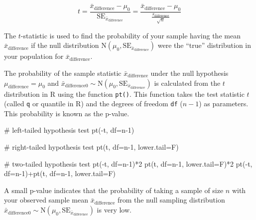 \documentclass[
  letterpaper,
  DIV=11,
  numbers=noendperiod]{scrartcl}
\newenvironment{Shaded}{\begin{snugshade}}{\end{snugshade}}
\newcommand{\AttributeTok}[1]{\textcolor[rgb]{0.40,0.45,0.13}{#1}}
\newcommand{\CommentTok}[1]{\textcolor[rgb]{0.37,0.37,0.37}{#1}}
\newcommand{\DecValTok}[1]{\textcolor[rgb]{0.68,0.00,0.00}{#1}}
\newcommand{\FunctionTok}[1]{\textcolor[rgb]{0.28,0.35,0.67}{#1}}
\newcommand{\NormalTok}[1]{\textcolor[rgb]{0.00,0.23,0.31}{#1}}
\newcommand{\SpecialCharTok}[1]{\textcolor[rgb]{0.37,0.37,0.37}{#1}}
\begin{document}
\[
t=\frac{\bar{x}_{\text{difference}}-\mu_0}{\text{SE}_{\bar{x}_{\text{difference}}}}=\frac{\bar{x}_{\text{difference}}-\mu_0}{\frac{s_{\text{difference}}}{\sqrt{n}}}
\]

The \(t\)-statistic is used to find the probability of your sample
having the mean \(\bar{x}_{\text{difference}}\) if the null distribution
\(\text{N}\left(\mu_0, \text{SE}_{\bar{x}_{\text{difference}}}\right)\)
were the ``true'' distribution in your population for
\(\bar{x}_{\text{difference}}\).

The probability of the sample statistic \(\bar{x}_{\text{difference}}\)
under the null hypothesis \(\mu_{\text{difference}}=\mu_0\) and
\(\bar{x}_{\text{difference0}} \sim \text{N}\left(\mu_0, \text{SE}_{\bar{x}_{\text{difference}}}\right)\)
is calculated from the \(t\) distribution in R using the function
\texttt{pt()}. This function takes the test statistic \(t\) (called
\texttt{q} or quantile in R) and the degrees of freedom \texttt{df}
(\(n-1\)) as parameters. This probability is known as the p-value.

\begin{Shaded}
\begin{Highlighting}[]
\CommentTok{\# left{-}tailed hypothesis test}
\FunctionTok{pt}\NormalTok{(}\SpecialCharTok{{-}}\NormalTok{t, }\AttributeTok{df=}\NormalTok{n}\DecValTok{{-}1}\NormalTok{)}

\CommentTok{\# right{-}tailed hypothesis test}
\FunctionTok{pt}\NormalTok{(t, }\AttributeTok{df=}\NormalTok{n}\DecValTok{{-}1}\NormalTok{, }\AttributeTok{lower.tail=}\NormalTok{F)}

\CommentTok{\# two{-}tailed hypothesis test}
\FunctionTok{pt}\NormalTok{(}\SpecialCharTok{{-}}\NormalTok{t, }\AttributeTok{df=}\NormalTok{n}\DecValTok{{-}1}\NormalTok{)}\SpecialCharTok{*}\DecValTok{2}
\FunctionTok{pt}\NormalTok{(t, }\AttributeTok{df=}\NormalTok{n}\DecValTok{{-}1}\NormalTok{, }\AttributeTok{lower.tail=}\NormalTok{F)}\SpecialCharTok{*}\DecValTok{2}
\FunctionTok{pt}\NormalTok{(}\SpecialCharTok{{-}}\NormalTok{t, }\AttributeTok{df=}\NormalTok{n}\DecValTok{{-}1}\NormalTok{)}\SpecialCharTok{+}\FunctionTok{pt}\NormalTok{(t, }\AttributeTok{df=}\NormalTok{n}\DecValTok{{-}1}\NormalTok{, }\AttributeTok{lower.tail=}\NormalTok{F)}
\end{Highlighting}
\end{Shaded}

A small p-value indicates that the probability of taking a sample of
size \(n\) with your observed sample mean
\(\bar{x}_{\text{difference}}\) from the null sampling distribution
\(\bar{x}_{\text{difference0}} \sim \text{N}\left(\mu_0, \text{SE}_{\bar{x}_{\text{difference}}}\right)\)
is very low.
\end{document}
